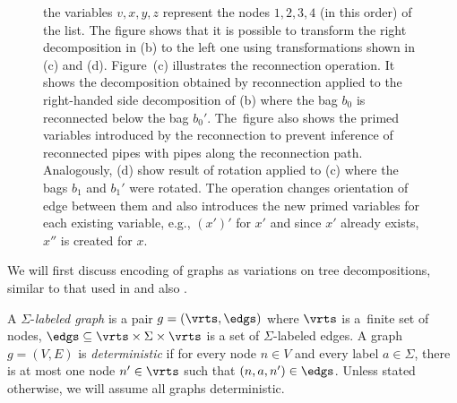 {\begin{figure}[t]
\begin{center}
{        the variables $v,x,y,z$ represent the nodes $1,2,3,4$ (in this order) of the list.
        The figure shows that it is possible to transform the right decomposition in (b) to the left one using transformations shown in (c) and (d).
        Figure~(c) illustrates the reconnection operation. It shows the decomposition obtained by reconnection applied to  the right-handed side decomposition of (b)
        where the bag $b_0$ is reconnected below the bag $b_0'$.
        The~figure also shows the primed variables introduced by the reconnection to prevent inference of reconnected pipes
        with pipes along the reconnection path.
        Analogously, (d) show result of rotation applied to (c) where the bags $b_1$ and $b_1'$ were rotated.
        The operation changes orientation of edge between them and also introduces the new primed variables for each existing variable,
        e.g., $(x')'$ for $x'$ and since $x'$ already exists, $x''$ is created for $x$.}
\label{fig:decomps}
\end{center}
\end{figure}

We will first discuss encoding of graphs as variations on tree decompositions, similar to that used in \cite{iosif_treewidth_2013} and also \cite{iosif_deciding_2014}.

A $\Sigma$-\emph{labeled graph} is a pair $g=(\vrts,\edgs)$
where $\vrts$ is a~finite set of nodes,
$\edgs\subseteq \vrts \times \Sigma \times \vrts$
is a set of $\Sigma$-labeled edges.
%
A graph $g = (V,E)$ is \emph{deterministic} if for every node $n\in V$ and every label $a\in\Sigma$,
there is at most one node $n'\in\vrts$ such that $(n,a,n')\in\edgs$.
Unless stated otherwise, we will assume all graphs deterministic.

}
